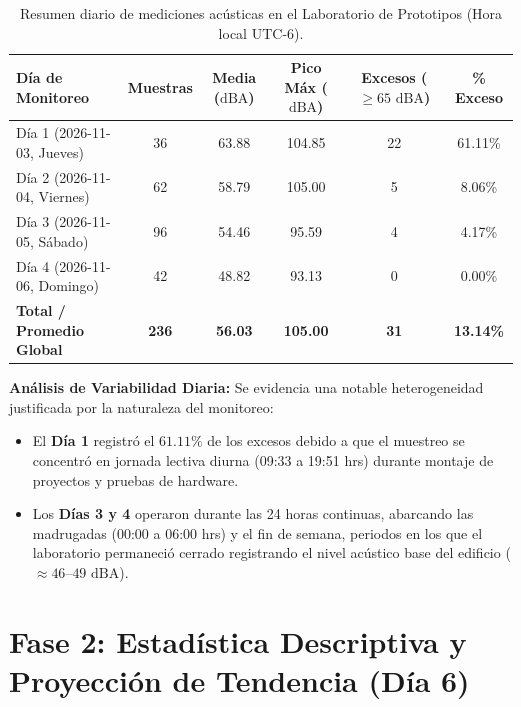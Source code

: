 \documentclass{article}
\begin{document}
\begin{table}[H]
\centering
\caption{Resumen diario de mediciones acústicas en el Laboratorio de Prototipos (Hora local UTC-6).}
\label{tab:resumen_dias}
\vspace{0.2cm}
\begin{tabular}{l c c c c c}
\toprule
\textbf{Día de Monitoreo} & \textbf{Muestras} & \textbf{Media ($\text{dBA}$)} & \textbf{Pico Máx ($\text{dBA}$)} & \textbf{Excesos ($\ge 65\text{ dBA}$)} & \textbf{\% Exceso} \\
\midrule
Día 1 (2026-11-03, Jueves) & 36 & 63.88 & 104.85 & 22 & 61.11\% \\
Día 2 (2026-11-04, Viernes) & 62 & 58.79 & 105.00 & 5 & 8.06\% \\
Día 3 (2026-11-05, Sábado) & 96 & 54.46 & 95.59 & 4 & 4.17\% \\
Día 4 (2026-11-06, Domingo) & 42 & 48.82 & 93.13 & 0 & 0.00\% \\
\midrule
\textbf{Total / Promedio Global} & \textbf{236} & \textbf{56.03} & \textbf{105.00} & \textbf{31} & \textbf{13.14\%} \\
\bottomrule
\end{tabular}
\end{table}

\noindent\textbf{Análisis de Variabilidad Diaria:}
Se evidencia una notable heterogeneidad justificada por la naturaleza del monitoreo:
\begin{itemize}
    \item El \textbf{Día 1} registró el $61.11\%$ de los excesos debido a que el muestreo se concentró en jornada lectiva diurna (09:33 a 19:51 hrs) durante montaje de proyectos y pruebas de hardware.
    \item Los \textbf{Días 3 y 4} operaron durante las 24 horas continuas, abarcando las madrugadas (00:00 a 06:00 hrs) y el fin de semana, periodos en los que el laboratorio permaneció cerrado registrando el nivel acústico base del edificio ($\approx 46\text{--}49\text{ dBA}$).
\end{itemize}

\section{Fase 2: Estadística Descriptiva y Proyección de Tendencia (Día 6)}
\end{document}

